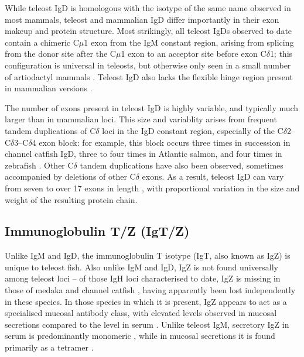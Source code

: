 While teleost IgD is homologous with the isotype of the same name observed in most mammals, teleost and mammalian IgD differ importantly in their exon makeup and protein structure. Most strikingly, all teleost IgDs observed to date contain a chimeric C$\mu$1 exon from the IgM constant region, arising from splicing from the donor site after the C$\mu$1 exon to an acceptor site before exon C$\delta$1; this configuration is universal in teleosts, but otherwise only seen in a small number of artiodactyl mammals \citep{fillatreau2013astonishing}. Teleost IgD also lacks the flexible hinge region present in mammalian versions \citep{fillatreau2013astonishing}. %

The number of exons present in teleost IgD is highly variable, and typically much larger than in mammalian loci. %
This size and variablity arises from frequent tandem duplications of C$\delta$ loci in the IgD constant region, especially of the C$\delta$2--C$\delta$3--C$\delta$4 exon block: for example, this block occurs three times in succession in channel catfish IgD, three to four times in Atlantic salmon, and four times in zebrafish \citep{fillatreau2013astonishing}. Other C$\delta$ tandem duplications have also been observed, sometimes accompanied by deletions of other C$\delta$ exons. As a result, teleost IgD can vary from seven to over 17 exons in length \citep{fillatreau2013astonishing}, with proportional variation in the size and weight of the resulting protein chain. %

\subsection{Immunoglobulin T/Z (IgT/Z)}

Unlike IgM and IgD, the immunoglobulin T isotype (IgT, also known as IgZ) is unique to teleost fish. Also unlike IgM and IgD, IgZ is not found universally among teleost loci -- of those IgH loci characterised to date, IgZ is missing in those of medaka %
and channel catfish %
\citep{fillatreau2013astonishing} , having apparently been lost independently in these species. In those species in which it is present, IgZ appears to act as a specialised mucosal antibody class, with elevated levels observed in mucosal secretions compared to the level in serum \citep{fillatreau2013astonishing} %
. Unlike teleost IgM, secretory IgZ in serum is predominantly monomeric %
, while in mucosal secretions it is found primarily as a tetramer \citep{fillatreau2013astonishing}. %

